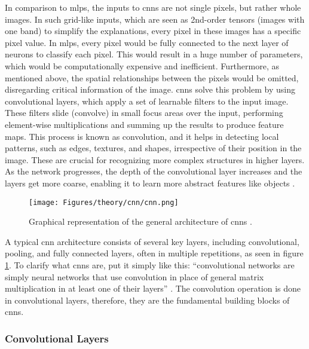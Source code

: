 In comparison to \glspl{mlp}, the inputs to \glspl{cnn} are not single pixels, but rather whole images. In such grid-like inputs, which are seen as 2nd-order tensors (images with one band) to simplify the explanations, every pixel in these images has a specific pixel value. In \glspl{mlp}, every pixel would be fully connected to the next layer of neurons to classify each pixel. This would result in a huge number of parameters, which would be computationally expensive and inefficient. Furthermore, as mentioned above, the spatial relationships between the pixels would be omitted, disregarding critical information of the image. \glspl{cnn} solve this problem by using convolutional layers, which apply a set of learnable filters to the input image. These filters slide (convolve) in small focus areas over the input, performing element-wise multiplications and summing up the results to produce feature maps. This process is known as convolution, and it helps in detecting local patterns, such as edges, textures, and shapes, irrespective of their position in the image. These are crucial for recognizing more complex structures in higher layers. As the network progresses, the depth of the convolutional layer increases and the layers get more coarse, enabling it to learn more abstract features like objects \autocite{Alzubaidi.Zhang.ea2021,Dumoulin.Visin2018,Nielsen2015,Szeliski2022,Zhang.Lipton.ea2023}.

\begin{figure}[htb]
    \centering
    \texttt{[image: Figures/theory/cnn/cnn.png]}
    \caption[ Architecture]{Graphical representation of the general architecture of \glspl{cnn} \autocite{Moharram.Sundaram2023}.}
    \label{fig:cnn}
\end{figure}

A typical \gls{cnn} architecture consists of several key layers, including convolutional, pooling, and fully connected layers, often in multiple repetitions, as seen in figure \ref{fig:cnn}. To clarify what \glspl{cnn} are, \textcite{Goodfellow.Bengio.ea2016} put it simply like this: \enquote{convolutional networks are simply neural networks that use convolution in place of general matrix multiplication in at least one of their layers} \autocite[326]{Goodfellow.Bengio.ea2016}. The convolution operation is done in convolutional layers, therefore, they are the fundamental building blocks of \glspl{cnn}. 

\subsubsection*{Convolutional Layers}
\label{subsec:convolution}

